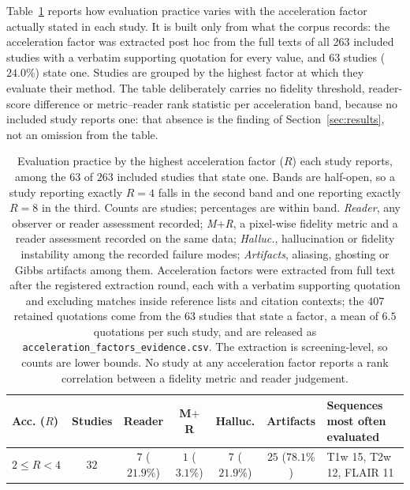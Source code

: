 \documentclass[review,authoryear]{elsarticle}
\begin{document}
Table~\ref{tab:acceleration_spectrum} reports how evaluation practice varies with the
acceleration factor actually stated in each study. It is built only from what the
corpus records: the acceleration factor was extracted post hoc from the full texts of
all 263 included studies with a verbatim supporting quotation for every value, and
$63$ studies ($24.0\%$) state one. Studies are grouped by the highest factor at which
they evaluate their method. The table deliberately carries no fidelity threshold,
reader-score difference or metric--reader rank statistic per acceleration band,
because no included study reports one: that absence is the finding of
Section~\ref{sec:results}, not an omission from the table.

\begin{table}[t]
\centering
\caption{Evaluation practice by the highest acceleration factor ($R$) each study
reports, among the $63$ of $263$ included studies that state one. Bands are half-open,
so a study reporting exactly $R=4$ falls in the second band and one reporting exactly
$R=8$ in the third. Counts are studies; percentages are within band. \emph{Reader}, any observer or reader assessment recorded;
\emph{M$+$R}, a pixel-wise fidelity metric and a reader assessment recorded on the same
data; \emph{Halluc.}, hallucination or fidelity instability among the recorded failure
modes; \emph{Artifacts}, aliasing, ghosting or Gibbs artifacts among them. Acceleration
factors were extracted from full text after the registered extraction round, each with a
verbatim supporting quotation and excluding matches inside reference lists and citation
contexts; the $407$ retained quotations come from the $63$ studies that state a factor,
a mean of $6.5$ quotations per such study, and are released as
\texttt{acceleration\_factors\_evidence.csv}. The extraction is screening-level, so
counts are lower bounds. No study at any acceleration factor reports a rank correlation
between a fidelity metric and reader judgement.}
\label{tab:acceleration_spectrum}
\footnotesize
\setlength{\tabcolsep}{2.5pt}
\renewcommand{\arraystretch}{1.2}
\begin{tabular}{l c c c c c >{\raggedright\arraybackslash}p{}}
\hline
\textbf{Acc. ($R$)} & \textbf{Studies} & \textbf{Reader} & \textbf{M$+$R} &
\textbf{Halluc.} & \textbf{Artifacts} & \textbf{Sequences most often evaluated} \\
\hline
$2\leq R<4$      & $32$ & $7$ ($21.9\%$) & $1$ ($3.1\%$)  & $7$ ($21.9\%$) & $25$ ($78.1\%$) & T1w 15, T2w 12, FLAIR 11 \\

\end{tabular}
\end{table}
\end{document}
